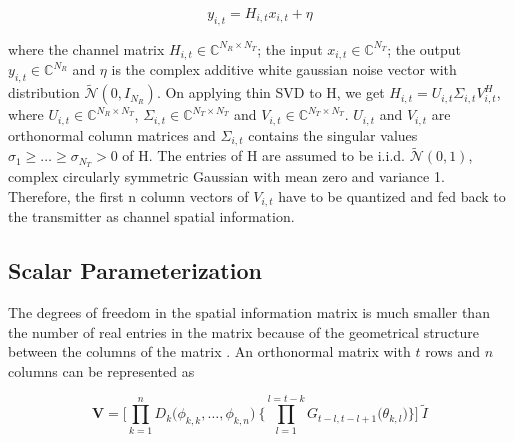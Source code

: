 \documentclass[conference]{IEEEtran}
\begin{document}
\vspace{-1pt} 

\begin{equation} 
y_{i,t} = H_{i,t} x_{i,t}+ \eta 
\end{equation} 

\vspace{-1pt} 

where the channel matrix $H_{i,t} \in \mathbb{C}^{N_R \times N_T}$; the input $x_{i,t} \in \mathbb{C}^{N_T}$; the output $y_{i,t} \in \mathbb{C}^{N_R}$ and $\eta$ is the complex additive white gaussian noise vector with distribution $\tilde{\mathcal{N}}(0,I_{N_R})$. On applying thin SVD to H, we get $H_{i,t} = U_{i,t} \Sigma_{i,t} V_{i,t}^{H}$, where $U_{i,t} \in \mathbb{C}^{N_R \times N_T}$, $\Sigma_{i,t} \in \mathbb{C}^{N_T \times N_T}$  and $V_{i,t} \in \mathbb{C}^{N_T \times N_T}$. $U_{i,t}$ and $V_{i,t}$ are orthonormal column matrices and $\Sigma_{i,t}$ contains the singular values $\sigma_1 \geq \ldots \geq \sigma_{N_T} > 0$ of H. The entries of H are assumed to be i.i.d. $\tilde{\mathcal{N}}(0,1)$, complex circularly symmetric Gaussian with mean zero and variance 1. Therefore, the first n column vectors of $V_{i,t}$ have to be quantized and fed back to the transmitter as channel spatial information.


\subsection{Scalar Parameterization} 
\label{givens}

The degrees of freedom in the spatial information matrix is much smaller than the number of real entries in the matrix because of the geometrical structure between the columns of the matrix \cite{4114278}. An orthonormal matrix with $t$ rows and $n$ columns can be represented as 

  

\begin{equation} 
\textbf{V} = \Bigg[\prod_{k=1}^{n} D_{k} \big( \phi_{k,k},\ldots , \phi_{k,n} \big) \: \Bigg\{ \prod_{l=1}^{l=t-k} G_{t-l,t-l+1} \big( \theta_{k,l}\big) \Bigg\} \Bigg] \: \tilde{I} 
\end{equation} 
  
\end{document}
